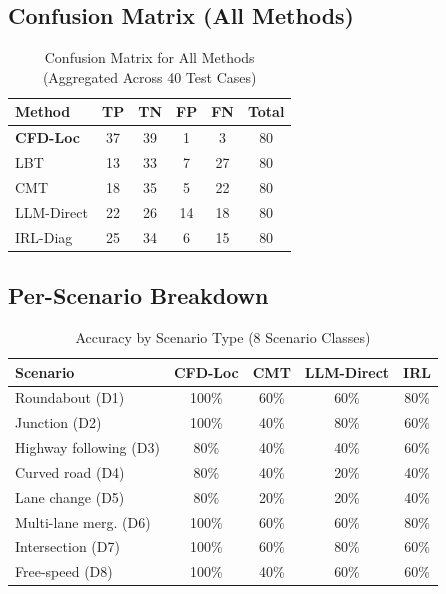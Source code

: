 \documentclass[conference]{IEEEtran}
\theoremstyle{plain}
\newcommand{\methodname}{\textbf{CFD-Loc}}
\begin{document}
\subsection{Confusion Matrix (All Methods)}
\begin{table}[h]
\centering
\caption{Confusion Matrix for All Methods (Aggregated Across 40 Test Cases)}
\label{tab:confusion}
\small
\begin{tabular}{lccccc}
\toprule
\textbf{Method} & \textbf{TP} & \textbf{TN} & \textbf{FP} & \textbf{FN} & \textbf{Total}\\\midrule
\methodname & 37 & 39 & 1 & 3 & 80\\
LBT & 13 & 33 & 7 & 27 & 80\\
CMT & 18 & 35 & 5 & 22 & 80\\
LLM-Direct & 22 & 26 & 14 & 18 & 80\\
IRL-Diag & 25 & 34 & 6 & 15 & 80\\
\bottomrule
\end{tabular}
\end{table}

\subsection{Per-Scenario Breakdown}
\begin{table}[h]
\centering
\caption{Accuracy by Scenario Type (8 Scenario Classes)}
\label{tab:per_scenario}
\small
\begin{tabular}{lcccc}
\toprule
\textbf{Scenario} & \textbf{\methodname} & \textbf{CMT} & \textbf{LLM-Direct} & \textbf{IRL}\\\midrule
Roundabout (D1) & 100\% & 60\% & 60\% & 80\%\\
Junction (D2) & 100\% & 40\% & 80\% & 60\%\\
Highway following (D3) & 80\% & 40\% & 40\% & 60\%\\
Curved road (D4) & 80\% & 40\% & 20\% & 40\%\\
Lane change (D5) & 80\% & 20\% & 20\% & 40\%\\
Multi-lane merg. (D6) & 100\% & 60\% & 60\% & 80\%\\
Intersection (D7) & 100\% & 60\% & 80\% & 60\%\\
Free-speed (D8) & 100\% & 40\% & 60\% & 60\%\\
\bottomrule
\end{tabular}
\end{table}
\end{document}
